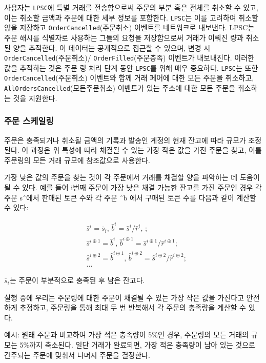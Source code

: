 \documentclass{article}
\begin{document}
\begin{multicols}{2}
사용자는 \verb|LPSC|에 특별 거래를 전송함으로써 주문의 부분 혹은 전체를 취소할 수 있고, 이는 취소할 금액과 주문에 대한 세부 정보를 포함한다. \verb|LPSC|는 이를 고려하여 취소할 양을 저장하고 \verb|OrderCancelled|(주문취소) 이벤트를 네트워크로 내보낸다. LPSC는 주문 해시를 식별자로 사용하는 그들의 요청을 저장함으로써 거래가 이뤄진 량과 취소된 양을 추적한다. 이 데이터는 공개적으로 접근할 수 있으며, 변경 시 \verb|OrderCancelled|(주문취소)/ \verb|OrderFilled|(주문충족) 이벤트가 내보내진다. 이러한 값을 추적하는 것은 주문 링 처리 단계 동안 \verb|LPSC|를 위해 매우 중요하다.
\verb|LPSC|는 또한 \verb|OrderCancelled|(주문취소) 이벤트와 함께 거래 페어에 대한 모든 주문을 취소하고, \verb|AllOrdersCancelled|(모든주문취소) 이벤트가 있는 주소에 대한 모든 주문을 취소하는 것을 지원한다.

\subsubsection{주문 스케일링\label{sec:order_scaling}}
주문은 충족되거나 취소될 금액의 기록과 발송인 계정의 현재 잔고에 따라 규모가 조정된다. 이 과정은 위 특성에 따라 채결될 수 있는 가장 작은 값을 가진 주문을 찾고, 이를 주문링의 모든 거래 규모에 참조값으로 사용한다.

가장 낮은 값의 주문을 찾는 것이 각 주문에서 거래를 채결할 양을 파악하는 데 도움이 될 수 있다. 예를 들어 i번째 주문이 가장 낮은 채결 가능한 잔고를 가진 주문인 경우 각 주문 sˆ에서 판매된 토큰 수와 각 주문 ˆb  에서 구매된 토큰 수를 다음과 같이 계산할 수 있다:

\[
\begin{split}
&\hat{s}^{i}=\overline{s}_i\text{, } \hat{b}^{i}=\hat{s}^{i}/ \hat{r}^i\text{, }\text{;}\\
&\hat{s}^{i\oplus 1}=\hat{b}^i\text{, } \hat{b}^{i\oplus 1}=\hat{s}^{i\oplus 1}/ \hat{r}^{i\oplus 1}\text{;}\\
&\hat{s}^{i\oplus 2}=\hat{b}^{i\oplus 1}\text{, } \hat{b}^{i\oplus 2}=\hat{s}^{i\oplus 2}/ \hat{r}^{i\oplus 2}\text{;}\\
& ...
\end{split}
\]

$\overline{s}_i$는 주문이 부분적으로 충족된 후 남은 잔고다.

실행 중에 우리는 주문링에 대한 주문이 채결될 수 있는 가장 작은 값을 가진다고 안전하게 추정하고, 주문링을 통해 최대 두 번 반복해서 각 주문의 충족량을 계산할 수 있다.

예시: 원래 주문과 비교하여 가장 적은 충족량이 5\%인 경우, 주문링의 모든 거래의 규모는 5\%까지 축소된다. 일단 거래가 완료되면, 가장 적은 충족량이 남아 있는 것으로 간주되는 주문에 맞춰서 나머지 주문을 결정한다. 



\end{multicols}
\end{document}
